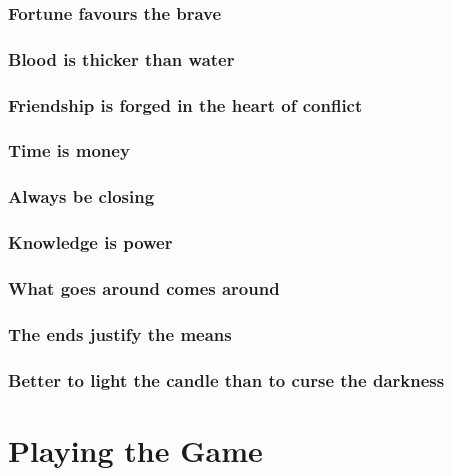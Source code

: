 \documentclass{report}
\begin{document}
\subsection{Fortune favours the brave}
\subsection{Blood is thicker than water}
\subsection{Friendship is forged in the heart of conflict}
\subsection{Time is money}
\subsection{Always be closing}
\subsection{Knowledge is power}
\subsection{What goes around comes around}
\subsection{The ends justify the means}
\subsection{Better to light the candle than to curse the darkness}

\chapter{Playing the Game}
\end{document}
